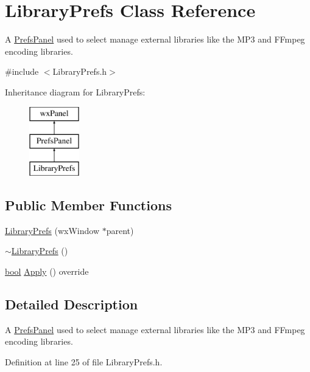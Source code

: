 \hypertarget{class_library_prefs}{}\section{Library\+Prefs Class Reference}
\label{class_library_prefs}


A \hyperlink{class_prefs_panel}{Prefs\+Panel} used to select manage external libraries like the M\+P3 and F\+Fmpeg encoding libraries.  




{\ttfamily \#include $<$Library\+Prefs.\+h$>$}

Inheritance diagram for Library\+Prefs\+:\begin{figure}[H]
\begin{center}
\leavevmode
\includegraphics[height=3.000000cm]{class_library_prefs}
\end{center}
\end{figure}
\subsection*{Public Member Functions}
\begin{DoxyCompactItemize}
\item 
\hyperlink{class_library_prefs_a66908abaa3134d1c924403db907f1ea1}{Library\+Prefs} (wx\+Window $\ast$parent)
\item 
\hyperlink{class_library_prefs_a4fbce0010ab89c1f9ce00f12fff6a95b}{$\sim$\+Library\+Prefs} ()
\item 
\hyperlink{mac_2config_2i386_2lib-src_2libsoxr_2soxr-config_8h_abb452686968e48b67397da5f97445f5b}{bool} \hyperlink{class_library_prefs_aeeae439d5fa50efc6464e0fde60aff0b}{Apply} () override
\end{DoxyCompactItemize}


\subsection{Detailed Description}
A \hyperlink{class_prefs_panel}{Prefs\+Panel} used to select manage external libraries like the M\+P3 and F\+Fmpeg encoding libraries. 

Definition at line 25 of file Library\+Prefs.\+h.



